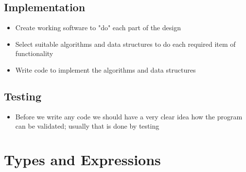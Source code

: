\documentclass{article}
\begin{document}
\subsection{Implementation}
\begin{itemize}
    \item Create working software to "do" each part of the design
    \item Select suitable algorithms and data structures to do each required item of functionality
    \item Write code to implement the algorithms and data structures
\end{itemize}
\subsection{Testing}
\begin{itemize}
    \item Before we write any code we should have a very clear idea how the program can be validated; usually that is done by testing
\end{itemize}
\section{Types and Expressions}
\end{document}
